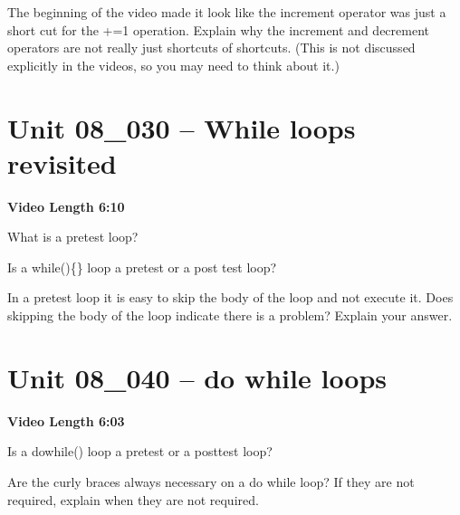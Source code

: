 \documentclass[letterpaper,12pt]{exam}
\newcommand{\unit}{Unit 08}
\begin{document}
\begin{questions}
\begin{samepage}
    \question The beginning of the video made it look like the increment operator was just a short cut for the +=1 operation.  Explain why the increment and decrement operators are not really just shortcuts of shortcuts.  (This is not discussed explicitly in the videos, so you may need to think about it.)
    \vspace{5mm}
\end{samepage}

\section*{\unit\_030 -- While loops revisited} %
\par{\selectfont\textbf{Video Length 6:10}}
\begin{samepage}
    \question What is a pretest loop?
    \vspace{5mm}
\end{samepage}

\begin{samepage}
    \question Is a while()\{\} loop a pretest or a post test loop?
    \vspace{5mm}
\end{samepage}
\begin{samepage}
    \question In a pretest loop it is easy to skip the body of the loop and not execute it.  Does skipping the body of the loop indicate there is a problem?  Explain your answer.
    \vspace{5mm}
\end{samepage}


\section*{\unit\_040 -- do while loops} 
\par{\selectfont\textbf{Video Length 6:03}}
\begin{samepage}
    \question Is a do{}while() loop a pretest or a posttest loop?
    \vspace{5mm}
\end{samepage}

\begin{samepage}
    \question Are the curly braces always necessary on a do while loop?  If they are not required, explain when they are not required.
    \vspace{5mm}
\end{samepage}



\end{questions}
\end{document}
